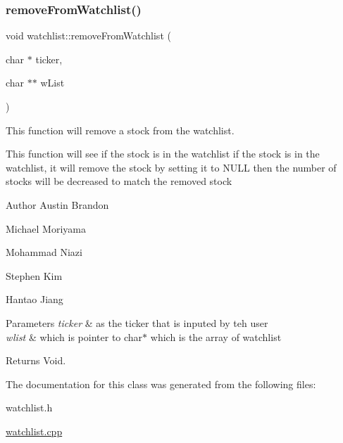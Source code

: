 \subsubsection{\texorpdfstring{remove\+From\+Watchlist()}{removeFromWatchlist()}}
{\footnotesize\ttfamily void watchlist\+::remove\+From\+Watchlist (\begin{DoxyParamCaption}\item[{char $\ast$}]{ticker,  }\item[{char $\ast$$\ast$}]{w\+List }\end{DoxyParamCaption})}



This function will remove a stock from the watchlist. 

This function will see if the stock is in the watchlist if the stock is in the watchlist, it will remove the stock by setting it to N\+U\+LL then the number of stocks will be decreased to match the removed stock

\begin{DoxyAuthor}{Author}
Austin Brandon 

Michael Moriyama 

Mohammad Niazi 

Stephen Kim 

Hantao Jiang 
\end{DoxyAuthor}

\begin{DoxyParams}{Parameters}
{\em ticker} & as the ticker that is inputed by teh user \\
\hline
{\em wlist} & which is pointer to char$\ast$ which is the array of watchlist \\
\hline
\end{DoxyParams}
\begin{DoxyReturn}{Returns}
Void. 
\end{DoxyReturn}


The documentation for this class was generated from the following files\+:\begin{DoxyCompactItemize}
\item 
watchlist.\+h\item 
\hyperlink{watchlist_8cpp}{watchlist.\+cpp}\end{DoxyCompactItemize}
